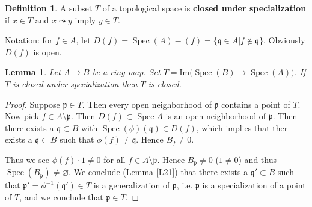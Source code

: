 \documentclass{article}
\newcommand{\fr}{\mathfrak}
\DeclareMathOperator{\Spec}{Spec}
\theoremstyle{plain}
\newtheorem{lem}[thm]{Lemma}
\theoremstyle{definition}
\newtheorem{defn}{Definition}
\theoremstyle{remark}
\begin{document}
\begin{defn}
A subset $T$ of a topological space is \textbf{closed under specialization} if $x\in T$ and $x \leadsto y$ imply $y\in T$.
\end{defn}

Notation: for $f\in A$, let $D(f) = \Spec(A) - (f) = \{\fr q \in A | f\not \in \fr q\}$. Obviously $D(f)$ is open.

\begin{lem}
\label{L22}
Let $A \to B$ be a ring map. Set $T = \text{Im} \big(\Spec(B) \to \Spec(A) \big)$. If $T$ is closed under specialization then $T$ is closed.
\end{lem}
\begin{proof}
Suppose $\fr p\in\bar T$. Then every open neighborhood of $\fr p$ contains a point of $T$. Now pick $f\in A\setminus{\fr p}$. Then $D(f)\subset\Spec A$ is an open neighborhood of $\fr p$. Then there exists a $\fr q\subset B$ with $\Spec(\phi)(\fr q)\in D(f)$, which implies that ther exists a $\fr q\subset B$ such that $\phi(f)\neq\fr q$. Hence $B_f\neq 0$.

Thus we see $\phi(f)\cdot 1\neq 0$ for all $f\in A\setminus\fr p$. Hence $B_\fr p\neq 0$ ($1\neq 0$) and thus $\Spec(B_\fr p)\neq\varnothing$. We conclude (Lemma \ref{L21}) that there exists a $\fr q'\subset B$ such that $\fr p'=\phi^{-1}(\fr q')\in T$ is a generalization of $\fr p$, i.e. $\fr p$ is a specialization of a point of $T$, and we conclude that $\fr p\in T$.
\end{proof}
\end{document}
